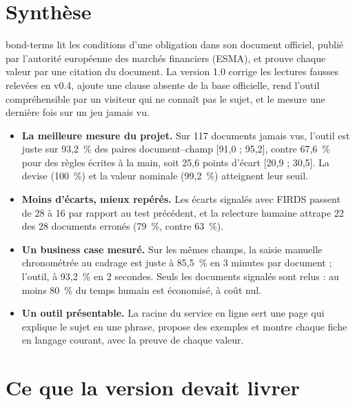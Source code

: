 \documentclass[11pt,a4paper]{article}
\begin{document}

\setcounter{tocdepth}{1}
\tableofcontents
\newpage

\section*{Synthèse}

bond-terms lit les conditions d'une obligation dans son document officiel, publié par l'autorité européenne des marchés financiers (ESMA), et prouve chaque valeur par une citation du document. La version 1.0 corrige les lectures fausses relevées en v0.4, ajoute une clause absente de la base officielle, rend l'outil compréhensible par un visiteur qui ne connaît pas le sujet, et le mesure une dernière fois sur un jeu jamais vu.

\begin{itemize}
  \item \textbf{La meilleure mesure du projet.} Sur 117 documents jamais vus, l'outil est juste sur 93,2~\% des paires document--champ [91,0 ; 95,2], contre 67,6~\% pour des règles écrites à la main, soit 25,6 points d'écart [20,9 ; 30,5]. La devise (100~\%) et la valeur nominale (99,2~\%) atteignent leur seuil.
  \item \textbf{Moins d'écarts, mieux repérés.} Les écarts signalés avec FIRDS passent de 28 à 16 par rapport au test précédent, et la relecture humaine attrape 22 des 28 documents erronés (79~\%, contre 63~\%).
  \item \textbf{Un business case mesuré.} Sur les mêmes champs, la saisie manuelle chronométrée au cadrage est juste à 85,5~\% en 3 minutes par document ; l'outil, à 93,2~\% en 2 secondes. Seuls les documents signalés sont relus : au moins 80~\% du temps humain est économisé, à coût nul.
  \item \textbf{Un outil présentable.} La racine du service en ligne sert une page qui explique le sujet en une phrase, propose des exemples et montre chaque fiche en langage courant, avec la preuve de chaque valeur.
\end{itemize}

\section{Ce que la version devait livrer}
\end{document}
